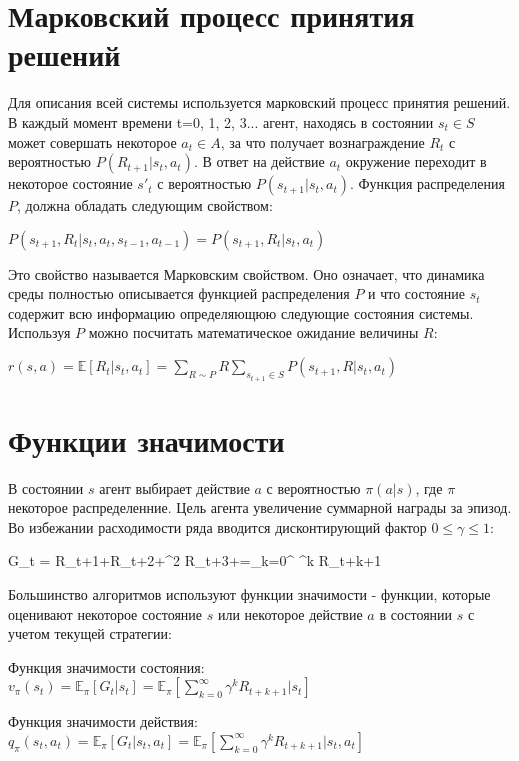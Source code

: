 \documentclass{mipt-thesis-bs}
\begin{document}
\section{Марковский процесс принятия решений}
Для описания всей системы используется марковский процесс принятия решений. В каждый момент времени t=0, 1, 2, 3... агент, находясь в состоянии $s_t\in S$ может совершать некоторое $a_t\in A$, за что получает вознаграждение $R_t$ с вероятностью $P(R_{t+1}|s_t,a_t)$. В ответ на действие $a_t$ окружение переходит в некоторое состояние $s'_t$ с вероятностью $P(s_{t+1}|s_t,a_t)$. Функция распределения $P$, должна обладать следующим свойством:

$P(s_{t+1}, R_{t}|s_t,a_t,s_{t-1},a_{t-1}) = P(s_{t+1}, R_{t}|s_t,a_t)$

Это свойство называется Марковским свойством. Оно означает, что динамика среды полностью описывается функцией распределения $P$ и что состояние $s_t$ содержит всю информацию определяющюю следующие состояния системы. Используя $P$ можно посчитать математическое ожидание величины $R$:

$r(s, a) = \mathbb{E}[R_{t} | s_t, a_t]=\sum_{R \sim P} R \sum_{s_{t+1} \in S} P(s_{t+1}, R | s_t, a_t)$



\section{Функции значимости}

В состоянии $s$ агент выбирает действие $a$ с вероятностью $\pi(a|s)$, где $\pi$ некоторое распределенние. Цель агента увеличение суммарной награды за эпизод. Во избежании расходимости ряда вводится дисконтирующий фактор $0 \leq\gamma\leq 1$:

G_{t} = R_{t+1}+\gamma R_{t+2}+\gamma^{2} R_{t+3}+\cdots=\sum_{k=0}^{\infty} \gamma^{k} R_{t+k+1}

Большинство алгоритмов используют функции значимости - функции, которые оценивают некоторое состояние $s$ или некоторое действие $a$ в состоянии $s$ с учетом текущей стратегии:

Функция значимости состояния: $v_{\pi}(s_t) = \mathbb{E}_{\pi}[G_{t} | s_t]=\mathbb{E}_{\pi}[\sum_{k=0}^{\infty} \gamma^{k} R_{t+k+1} | s_t]$ 
 
Функция значимости действия: $q_{\pi}(s_t, a_t) = \mathbb{E}_{\pi}[G_{t} | s_{t}, a_{t}]=\mathbb{E}_{\pi}[\sum_{k=0}^{\infty} \gamma^{k} R_{t+k+1} | s_{t}, a_{t}]$
\end{document}

